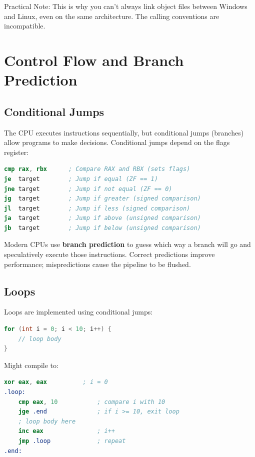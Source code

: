 \begin{warning}
  Practical Note: This is why you can't always link object files between Windows and Linux, even on the same architecture. The calling conventions are incompatible.
\end{warning}

\section{Control Flow and Branch Prediction}

\subsection{Conditional Jumps}

The CPU executes instructions sequentially, but conditional jumps (branches) allow programs to make decisions. Conditional jumps depend on the flags register:

\begin{lstlisting}[language=nasm,basicstyle=\ttfamily\small]
cmp rax, rbx      ; Compare RAX and RBX (sets flags)
je  target        ; Jump if equal (ZF == 1)
jne target        ; Jump if not equal (ZF == 0)
jg  target        ; Jump if greater (signed comparison)
jl  target        ; Jump if less (signed comparison)
ja  target        ; Jump if above (unsigned comparison)
jb  target        ; Jump if below (unsigned comparison)
\end{lstlisting}

Modern CPUs use \textbf{branch prediction} to guess which way a branch will go and speculatively execute those instructions. Correct predictions improve performance; mispredictions cause the pipeline to be flushed.

\subsection{Loops}

Loops are implemented using conditional jumps:

\begin{lstlisting}[language=C]
for (int i = 0; i < 10; i++) {
    // loop body
}
\end{lstlisting}

Might compile to:

\begin{lstlisting}[language=nasm,basicstyle=\ttfamily\small]
    xor eax, eax          ; i = 0
.loop:
    cmp eax, 10           ; compare i with 10
    jge .end              ; if i >= 10, exit loop
    ; loop body here
    inc eax               ; i++
    jmp .loop             ; repeat
.end:
\end{lstlisting}

